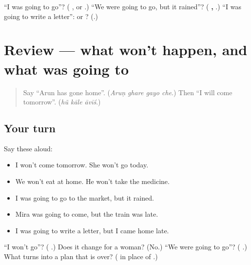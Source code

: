 \begin{tcolorbox}[breakable,colback=teal!4,colframe=teal!35!black,title={Before you move on}]
\textquotedblleft{}I was going to go\textquotedblright{}? (\textbf{  }, or \textbf{ }.) \textquotedblleft{}We were going to go, but it rained\textquotedblright{}? (\textbf{  ,   }.) \textquotedblleft{}I was going to write a letter\textquotedblright{}: \textbf{} or \textbf{}? (\textbf{}.)
\end{tcolorbox}
\section[(review)]{Review — what won't happen, and what was going to}

\label{lesson:GU-R274-plans-that-changed}



\begin{quote}
Say \textquotedblleft{}Arun has gone home\textquotedblright{}. (\emph{Aruṇ ghare gayo che}.) Then \textquotedblleft{}I will come tomorrow\textquotedblright{}. (\emph{hũ kāle āvīś}.)
\end{quote}

\subsection*{Your turn}
Say these aloud:

\begin{itemize}
\raggedright
  \item I won't come tomorrow. She won't go today.
  \item We won't eat at home. He won't take the medicine.
  \item I was going to go to the market, but it rained.
  \item Mira was going to come, but the train was late.
  \item I was going to write a letter, but I came home late.
\end{itemize}

\begin{tcolorbox}[breakable,colback=teal!4,colframe=teal!35!black,title={Before you move on}]
\textquotedblleft{}I won't go\textquotedblright{}? (\textbf{  }.) Does it change for a woman? (No.) \textquotedblleft{}We were going to go\textquotedblright{}? (\textbf{  }.) What turns \textbf{ } into a plan that is over? (\textbf{} in place of \textbf{}.)
\end{tcolorbox}
